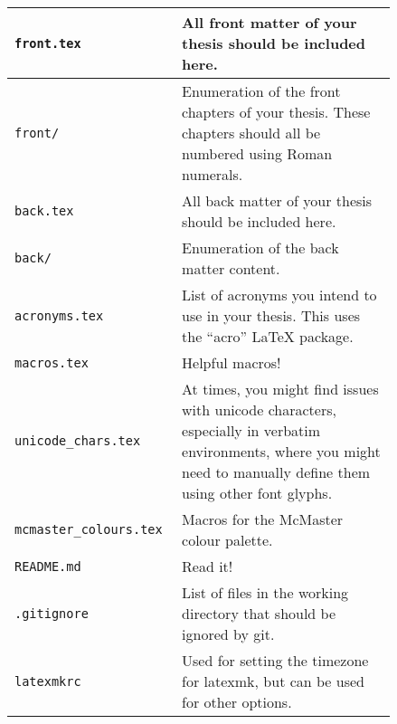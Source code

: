 \begin{longtable}[c]{|>{\raggedright}p{0.3\linewidth}|>{\raggedright\arraybackslash}p{0.54\linewidth}|}
    \texttt{front.tex}             & All front matter of your thesis should be included
    here.                                                                                      \\ \hline

    \texttt{front/}                & Enumeration of the front chapters of your thesis. These
    chapters should all be numbered using Roman numerals.                                      \\ \hline

    \texttt{back.tex}              & All back matter of your thesis should be included here.
    \\ \hline

    \texttt{back/}                 & Enumeration of the back matter content.
    \\ \hline

    \texttt{acronyms.tex}          & List of acronyms you intend to use in your thesis.
    This uses the ``acro'' \LaTeX{} package.
    \\ \hline

    \texttt{macros.tex}            & Helpful macros!
    \\ \hline

    \texttt{unicode\_chars.tex}    & At times, you might find issues with unicode
    characters, especially in verbatim environments, where you might need to
    manually define them using other font glyphs.
    \\ \hline

    \texttt{mcmaster\_colours.tex} & Macros for the McMaster colour palette.
    \\ \hline

    \texttt{README.md}             & Read it!
    \\ \hline

    \texttt{.gitignore}            & List of files in the working directory that should be
    ignored by git.
    \\ \hline

    \texttt{latexmkrc}             & Used for setting the timezone for latexmk, but can be
    used for other options.
    \\ \hline
\end{longtable}
